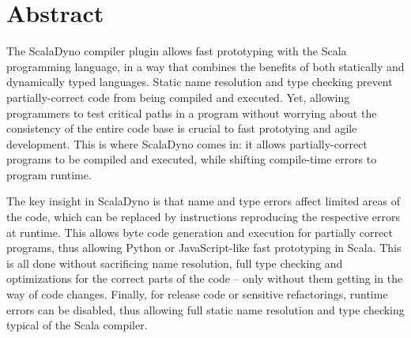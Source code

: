 \section{Abstract}





The ScalaDyno compiler plugin allows fast prototyping with the Scala programming language, in a way that combines the benefits of both statically and dynamically typed languages. Static name resolution and type checking prevent partially-correct code from being compiled and executed. Yet, allowing programmers to test critical paths in a program without worrying about the consistency of the entire code base is crucial to fast prototying and agile development. This is where ScalaDyno comes in: it allows partially-correct programs to be compiled and executed, while shifting compile-time errors to program runtime.

The key insight in ScalaDyno is that name and type errors affect limited areas of the code, which can be replaced by instructions reproducing the respective errors at runtime. This allows byte code generation and execution for partially correct programs, thus allowing Python or JavaScript-like fast prototyping in Scala. This is all done without sacrificing name resolution, full type checking and optimizations for the correct parts of the code -- only without them getting in the way of code changes. Finally, for release code or sensitive refactorings, runtime errors can be disabled, thus allowing full static name resolution and type checking typical of the Scala compiler.


